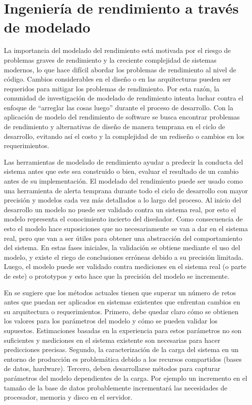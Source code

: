 \documentclass[11pt, twoside]{report}
\begin{document}
\section{Ingeniería de rendimiento a través de modelado} 
La importancia del modelado del rendimiento está motivada por el riesgo de problemas graves de rendimiento\cite{palladion-screencast} y la creciente complejidad de sistemas modernos, lo que hace difícil abordar los problemas de rendimiento al nivel de código. Cambios considerables en el diseño o en las arquitecturas pueden ser requeridos para mitigar los problemas de rendimiento. Por esta razón, la comunidad de investigación de modelado de rendimiento intenta luchar contra el enfoque de ``arreglar las cosas luego'' durante el proceso de desarrollo. Con la aplicación de modelo del rendimiento de software se busca encontrar problemas de rendimiento y alternativas de diseño de manera temprana en el ciclo de desarrollo, evitando así el costo y la complejidad de un rediseño o cambios en los requerimientos.

Las herramientas de modelado de rendimiento ayudar a predecir la conducta del sistema antes que este sea construido o bien, evaluar el resultado de un cambio antes de su implementación. El modelado del rendimiento puede ser usado como una herramienta de alerta temprana durante todo el ciclo de desarrollo con mayor precisión y modelos cada vez más detallados a lo largo del proceso. Al inicio del desarrollo un modelo no puede ser validado contra un sistema real, por esto el modelo representa el conocimiento incierto del diseñador. Como consecuencia de esto el modelo hace suposiciones que no necesariamente se van a dar en el sistema real, pero que van a ser útiles para obtener una abstracción del comportamiento del sistema. En estas fases iniciales, la validación se obtiene mediante el uso del modelo, y existe el riego de conclusiones erróneas debido a su precisión limitada. Luego, el modelo puede ser validado contra mediciones en el sistema real (o parte de este) o prototypos y esto hace que la precisión del modelo se incremente.

En \cite{jit-et-al} se sugiere que los métodos actuales tienen que superar un número de retos antes que puedan ser aplicados en sistemas existentes que enfrentan cambios en su arquitectura o requerimientos. Primero, debe quedar claro cómo se obtienen los valores para los parámetros del modelo y cómo se pueden validar los supuestos. Estimaciones basadas en la experiencia para estos parámetros no son suficientes y mediciones en el sistema existente son necesarias para hacer predicciones precisas. Segundo, la caracterización de la carga del sistema en un entorno de producción es problemática debido a los recursos compartidos (bases de datos, hardware). Tercero, deben desarrollarse métodos para capturar parámetros del modelo dependientes de la carga. Por ejemplo un incremento en el tamaño de la base de datos probablemente incrementará las necesidades de procesador, memoria y disco en el servidor.
\end{document}
